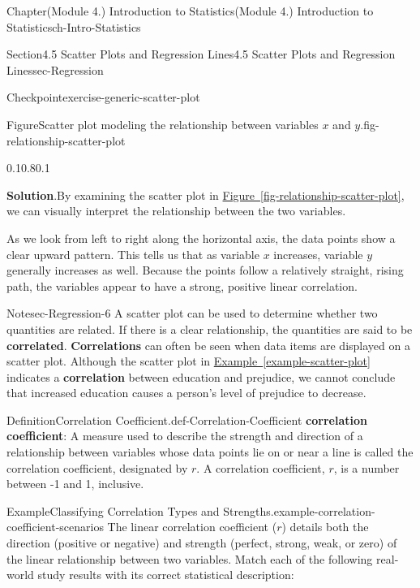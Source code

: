 \documentclass[oneside,10pt,]{book}
\newcommand{\blocktitlefont}{\relax}
\newcommand{\xreffont}{\relax}
\newcommand{\terminology}[1]{\textbf{#1}}
\begin{document}
\begin{chapterptx}{Chapter}{(Module 4.) Introduction to Statistics}{}{(Module 4.) Introduction to Statistics}{}{}{ch-Intro-Statistics}
\begin{sectionptx}{Section}{4.5 Scatter Plots and Regression Lines}{}{4.5 Scatter Plots and Regression Lines}{}{}{sec-Regression}
\begin{inlineexercise}{Checkpoint}{}{exercise-generic-scatter-plot}
\begin{figureptx}{Figure}{Scatter plot modeling the relationship between variables \(x\) and \(y\).}{fig-relationship-scatter-plot}{}
\begin{image}{0.1}{0.8}{0.1}{}
{%
}%
\end{image}%
\tcblower
\end{figureptx}%
\par\smallskip%
\noindent\textbf{\blocktitlefont Solution}.\hypertarget{exercise-generic-scatter-plot-2}{}\quad{}By examining the scatter plot in \hyperref[fig-relationship-scatter-plot]{Figure~{\xreffont\ref{fig-relationship-scatter-plot}}}, we can visually interpret the relationship between the two variables.%
\par
As we look from left to right along the horizontal axis, the data points show a clear upward pattern. This tells us that as variable \(x\) increases, variable \(y\) generally increases as well. Because the points follow a relatively straight, rising path, the variables appear to have a strong, positive linear correlation.%
\end{inlineexercise}%
\begin{note}{Note}{}{sec-Regression-6}%
A scatter plot can be used to determine whether two quantities are related. If there is a clear relationship, the quantities are said to be \terminology{correlated}. \terminology{Correlations} can often be seen when data items are displayed on a scatter plot. Although the scatter plot in \hyperref[example-scatter-plot]{Example~{\xreffont\ref{example-scatter-plot}}} indicates a \terminology{correlation} between education and prejudice, we cannot conclude that increased education causes a person's level of prejudice to decrease.%
\end{note}
\begin{definition}{Definition}{Correlation Coefficient.}{def-Correlation-Coefficient}%
\terminology{correlation coefficient}: A measure used to describe the strength and direction of a relationship between variables whose data points lie on or near a line is called the correlation coefficient, designated by \(r\). A correlation coefficient, \(r\), is a number between -1 and 1, inclusive.%
\end{definition}
\begin{example}{Example}{Classifying Correlation Types and Strengths.}{example-correlation-coefficient-scenarios}%
The linear correlation coefficient (\(r\)) details both the direction (positive or negative) and strength (perfect, strong, weak, or zero) of the linear relationship between two variables. Match each of the following real-world study results with its correct statistical description:%

\end{example}
\end{sectionptx}
\end{chapterptx}
\end{document}
